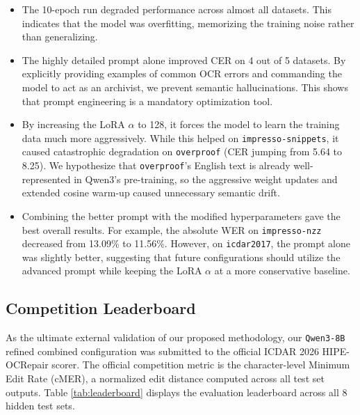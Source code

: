 \documentclass[11pt]{extarticle}
\begin{document}
\begin{itemize}
    \item The 10-epoch run degraded performance across almost all datasets. This indicates that the model was overfitting, memorizing the training noise rather than generalizing.
    \item The highly detailed prompt alone improved CER on 4 out of 5 datasets. By explicitly providing examples of common OCR errors and commanding the model to act as an archivist, we prevent semantic hallucinations. This shows that prompt engineering is a mandatory optimization tool.
    \item By increasing the LoRA $\alpha$ to 128, it forces the model to learn the training data much more aggressively. While this helped on \texttt{impresso-snippets}, it caused catastrophic degradation on \texttt{overproof} (CER jumping from 5.64 to 8.25). We hypothesize that \texttt{overproof}'s English text is already well-represented in Qwen3's pre-training, so the aggressive weight updates and extended cosine warm-up caused unnecessary semantic drift.
    \item Combining the better prompt with the modified hyperparameters gave the best overall results. For example, the absolute WER on \texttt{impresso-nzz} decreased from 13.09\% to 11.56\%. However, on \texttt{icdar2017}, the prompt alone was slightly better, suggesting that future configurations should utilize the advanced prompt while keeping the LoRA $\alpha$ at a more conservative baseline.
\end{itemize}

\subsection{Competition Leaderboard}

As the ultimate external validation of our proposed methodology, our \texttt{Qwen3-8B} refined combined configuration was submitted to the official ICDAR 2026 HIPE-OCRepair scorer. The official competition metric is the character-level Minimum Edit Rate (cMER), a normalized edit distance computed across all test set outputs. Table \ref{tab:leaderboard} displays the evaluation leaderboard across all 8 hidden test sets.
\end{document}
